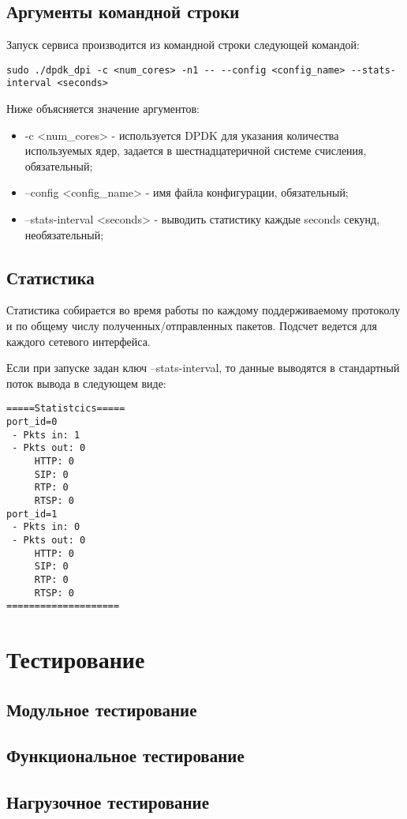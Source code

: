 \subsection{Аргументы командной строки}
Запуск сервиса производится из командной строки следующей командой:
\begin{lstlisting}
sudo ./dpdk_dpi -c <num_cores> -n1 -- --config <config_name> --stats-interval <seconds>
\end{lstlisting}
Ниже объясняется значение аргументов:
\begin{itemize}
\item -c <num\_cores> - используется DPDK для указания количества используемых ядер, задается в шестнадцатеричной системе счисления, обязательный;
\item --config <config\_name> - имя файла конфигурации, обязательный;
\item --stats-interval <seconds> - выводить статистику каждые seconds секунд, необязательный;
\end{itemize}

\subsection{Статистика}
Статистика собирается во время работы по каждому поддерживаемому протоколу и по общему числу полученных/отправленных пакетов. Подсчет ведется для каждого сетевого интерфейса.

Если при запуске задан ключ --stats-interval, то данные выводятся в стандартный поток вывода в следующем виде:
\begin{lstlisting}
=====Statistcics=====
port_id=0
 - Pkts in: 1
 - Pkts out: 0
     HTTP: 0
     SIP: 0
     RTP: 0
     RTSP: 0
port_id=1
 - Pkts in: 0
 - Pkts out: 0
     HTTP: 0
     SIP: 0
     RTP: 0
     RTSP: 0
====================
\end{lstlisting}


\section{Тестирование}
\subsection{Модульное тестирование}
\subsection{Функциональное тестирование}
\subsection{Нагрузочное тестирование}
